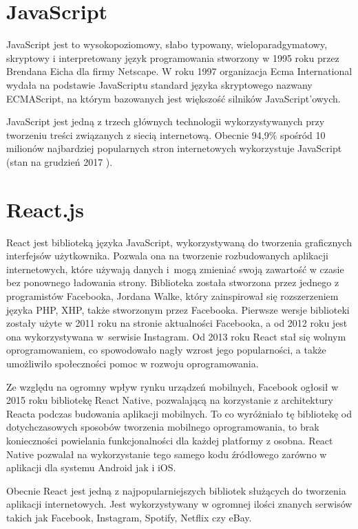 \section{JavaScript}
JavaScript jest to wysokopoziomowy, słabo typowany, wieloparadgymatowy, skryptowy i interpretowany język programowania stworzony w 1995 roku przez Brendana Eicha dla firmy Netscape.  W roku 1997 organizacja Ecma International wydała na podstawie JavaScriptu standard języka skryptowego nazwany ECMAScript, na którym bazowanych jest większość silników JavaScript'owych.

JavaScript jest jedną z trzech głównych technologii wykorzystywanych przy tworzeniu treści związanych z siecią internetową. Obecnie 94,9\% spośród 10 milionów najbardziej popularnych stron internetowych wykorzystuje JavaScript (stan na grudzień 2017 \cite{JSUsage}).

\section{React.js}
React jest biblioteką języka JavaScript, wykorzystywaną do tworzenia graficznych interfejsów użytkownika. Pozwala ona na tworzenie rozbudowanych aplikacji internetowych, które używają danych i~mogą zmieniać swoją zawartość w czasie bez ponownego ładowania strony. Biblioteka została stworzona przez jednego z programistów Facebooka, Jordana Walke, który zainspirował się rozszerzeniem języka PHP, XHP, także stworzonym przez Facebooka. Pierwsze wersje biblioteki zostały użyte w 2011 roku na stronie aktualności Facebooka, a od 2012 roku jest ona wykorzystywana w~serwisie Instagram. Od 2013 roku React stał się wolnym oprogramowaniem, co spowodowało nagły wzrost jego popularności, a także umożliwiło społeczności  pomoc w rozwoju oprogramowania.

Ze względu na ogromny wpływ rynku urządzeń mobilnych, Facebook ogłosił w 2015 roku bibliotekę React Native, pozwalającą na korzystanie z architektury Reacta podczas budowania aplikacji mobilnych. To co wyróżniało tę bibliotekę od dotychczasowych sposobów tworzenia mobilnego oprogramowania, to brak konieczności powielania funkcjonalności dla każdej platformy z osobna. React Native pozwalał na wykorzystanie tego samego kodu źródłowego zarówno w aplikacji dla systemu Android jak i iOS.

Obecnie React jest jedną z najpopularniejszych bibliotek służących do tworzenia aplikacji internetowych. Jest wykorzystywany w ogromnej ilości znanych serwisów takich jak Facebook, Instagram, Spotify, Netflix czy eBay. 
